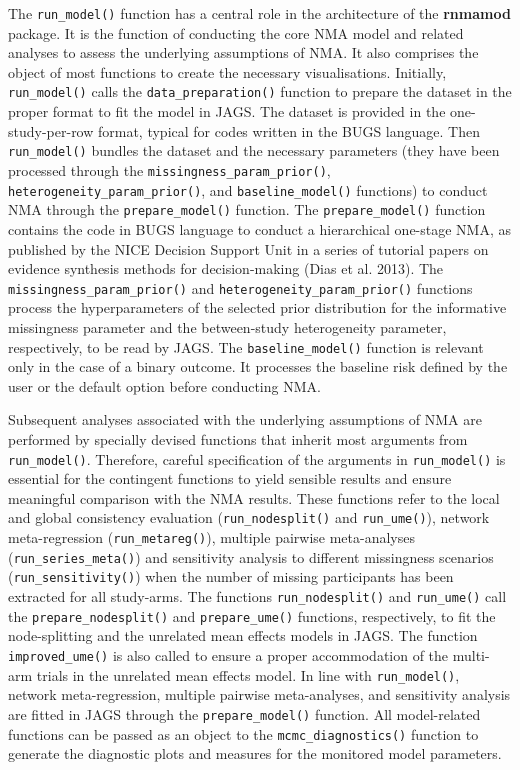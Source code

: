 The \texttt{run\_model()} function has a central role in the architecture of the \textbf{rnmamod}
package. It is the function of conducting the core NMA model and related analyses
to assess the underlying assumptions of NMA. It also comprises the object of most
functions to create the necessary visualisations. Initially, \texttt{run\_model()} calls
the \texttt{data\_preparation()} function to prepare the dataset in the proper format to
fit the model in JAGS. The dataset is provided in the one-study-per-row format,
typical for codes written in the BUGS language. Then \texttt{run\_model()} bundles the
dataset and the necessary parameters (they have been processed through the
\texttt{missingness\_param\_prior()}, \texttt{heterogeneity\_param\_prior()}, and \texttt{baseline\_model()}
functions) to conduct NMA through the \texttt{prepare\_model()} function. The \texttt{prepare\_model()}
function contains the code in BUGS language to conduct a hierarchical one-stage
NMA, as published by the NICE Decision Support Unit in a series of tutorial papers
on evidence synthesis methods for decision-making (Dias et al. 2013). The \texttt{missingness\_param\_prior()}
and \texttt{heterogeneity\_param\_prior()} functions process the hyperparameters of the
selected prior distribution for the informative missingness parameter and the
between-study heterogeneity parameter, respectively, to be read by JAGS.
The \texttt{baseline\_model()} function is relevant only in the case of a binary outcome.
It processes the baseline risk defined by the user or the default option before
conducting NMA.

Subsequent analyses associated with the underlying assumptions of NMA are performed
by specially devised functions that inherit most arguments from \texttt{run\_model()}.
Therefore, careful specification of the arguments in \texttt{run\_model()} is essential
for the contingent functions to yield sensible results and ensure meaningful
comparison with the NMA results. These functions refer to the local and global
consistency evaluation (\texttt{run\_nodesplit()} and \texttt{run\_ume()}), network meta-regression
(\texttt{run\_metareg()}), multiple pairwise meta-analyses (\texttt{run\_series\_meta()}) and
sensitivity analysis to different missingness scenarios (\texttt{run\_sensitivity()}) when
the number of missing participants has been extracted for all study-arms.
The functions \texttt{run\_nodesplit()} and \texttt{run\_ume()} call the \texttt{prepare\_nodesplit()} and
\texttt{prepare\_ume()} functions, respectively, to fit the node-splitting and the unrelated
mean effects models in JAGS. The function \texttt{improved\_ume()} is also called to ensure
a proper accommodation of the multi-arm trials in the unrelated mean effects model.
In line with \texttt{run\_model()}, network meta-regression, multiple pairwise meta-analyses,
and sensitivity analysis are fitted in JAGS through the \texttt{prepare\_model()} function.
All model-related functions can be passed as an object to the \texttt{mcmc\_diagnostics()}
function to generate the diagnostic plots and measures for the monitored model
parameters.

